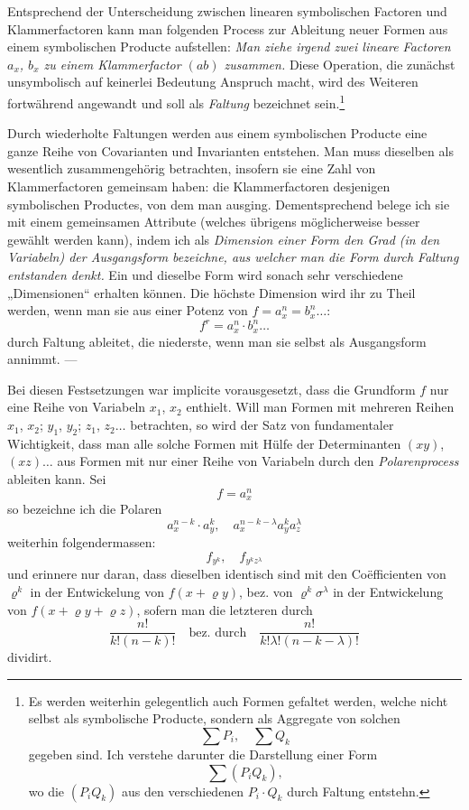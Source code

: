 \documentclass[10pt]{article}
\begin{document}
Entsprechend der Unterscheidung zwischen linearen symbolischen Factoren und Klammerfactoren kann man folgenden Process zur Ableitung neuer Formen aus einem symbolischen Producte aufstellen: \emph{Man ziehe irgend zwei lineare Factoren $a_x$, $b_x$ zu einem Klammerfactor $(ab)$ zusammen.} Diese Operation, die zunächst unsymbolisch auf keinerlei Bedeutung Anspruch macht, wird des Weiteren fortwährend angewandt und soll als \emph{Faltung} bezeichnet sein.\footnote{Es werden weiterhin gelegentlich auch Formen gefaltet werden, welche nicht selbst als symbolische Producte, sondern als Aggregate von solchen
\[
\sum P_i,\quad \sum Q_k
\]
gegeben sind. Ich verstehe darunter die Darstellung einer Form
\[
\sum(P_i Q_k),
\]
wo die $(P_i Q_k)$ aus den verschiedenen $P_i\cdot Q_k$ durch Faltung entstehn.}

Durch wiederholte Faltungen werden aus einem symbolischen Producte eine ganze Reihe von Covarianten und Invarianten entstehen. Man muss dieselben als wesentlich zusammengehörig betrachten, insofern sie eine Zahl von Klammerfactoren gemeinsam haben: die Klammerfactoren desjenigen symbolischen Productes, von dem man ausging. Dementsprechend belege ich sie mit einem gemeinsamen Attribute (welches übrigens möglicherweise besser gewählt werden kann), indem ich als \emph{Dimension einer Form den Grad (in den Variabeln) der Ausgangsform bezeichne, aus welcher man die Form durch Faltung entstanden denkt.} Ein und dieselbe Form wird sonach sehr verschiedene „Dimensionen`` erhalten können. Die höchste Dimension wird ihr zu Theil werden, wenn man sie aus einer Potenz von $f=a_x^n=b_x^n\ldots$:
\[
f^r=a_x^n\cdot b_x^n\ldots
\]
durch Faltung ableitet, die niederste, wenn man sie selbst als Ausgangsform annimmt. ---

Bei diesen Festsetzungen war implicite vorausgesetzt, dass die Grundform $f$ nur eine Reihe von Variabeln $x_1$, $x_2$ enthielt. Will man Formen mit mehreren Reihen $x_1$, $x_2$; $y_1$, $y_2$; $z_1$, $z_2\ldots$ betrachten, so wird der Satz von fundamentaler Wichtigkeit, dass man alle solche Formen mit Hülfe der Determinanten $(xy)$, $(xz)\ldots$ aus Formen mit nur einer Reihe von Variabeln durch den \emph{Polarenprocess} ableiten kann. Sei
\[
f=a_x^n
\]
so bezeichne ich die Polaren
\[
a_x^{n-k}\cdot a_y^k,\quad a_x^{n-k-\lambda}a_y^k a_z^\lambda
\]
weiterhin folgendermassen:
\[
f_{y^k},\quad f_{y^k z^\lambda}
\]
und erinnere nur daran, dass dieselben identisch sind mit den Coëfficienten von $\varrho^k$ in der Entwickelung von $f(x+\varrho y)$, bez. von $\varrho^k\sigma^\lambda$ in der Entwickelung von $f(x+\varrho y+\varrho z)$, sofern man die letzteren durch
\[
\frac{n!}{k!(n-k)!}\quad\text{bez. durch}\quad \frac{n!}{k!\lambda!(n-k-\lambda)!}
\]
dividirt.
\end{document}
